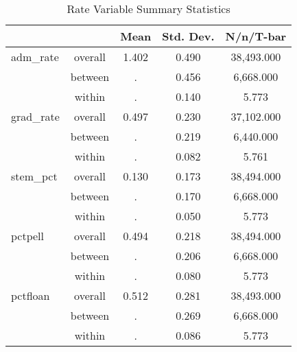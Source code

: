 \begin{table}[htbp]\centering
\caption{Rate Variable Summary Statistics}
\begin{tabular}{lc*{3}{c}}
\hline\hline
            &            &        Mean&   Std. Dev.&   N/n/T-bar\\
\hline
adm\_rate    &  overall   &       1.402&       0.490&  38,493.000\\
            &  between   &           .&       0.456&   6,668.000\\
            &   within   &           .&       0.140&       5.773\\
grad\_rate   &  overall   &       0.497&       0.230&  37,102.000\\
            &  between   &           .&       0.219&   6,440.000\\
            &   within   &           .&       0.082&       5.761\\
stem\_pct    &  overall   &       0.130&       0.173&  38,494.000\\
            &  between   &           .&       0.170&   6,668.000\\
            &   within   &           .&       0.050&       5.773\\
pctpell     &  overall   &       0.494&       0.218&  38,494.000\\
            &  between   &           .&       0.206&   6,668.000\\
            &   within   &           .&       0.080&       5.773\\
pctfloan    &  overall   &       0.512&       0.281&  38,493.000\\
            &  between   &           .&       0.269&   6,668.000\\
            &   within   &           .&       0.086&       5.773\\
\hline\hline
\end{tabular}
\end{table}
